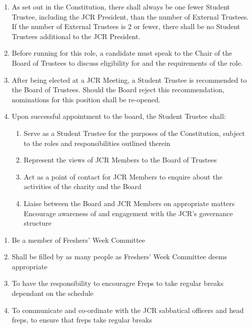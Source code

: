 \begin{enumerate}
    \item As set out in the Constitution, %
    there shall always be one fewer Student Trustee, including the JCR President, than the number of External Trustees. %
    If the number of External Trustees is 2 or fewer, there shall be no Student Trustees additional to the JCR President.
    \item Before running for this role, a candidate must speak to the Chair of the Board of Trustees to discuss eligibility for and the requirements of the role.
    \item After being elected at a JCR Meeting, a Student Trustee is recommended to the Board of Trustees. Should the Board reject this recommendation, nominations for this position shall be re-opened. 
    \item Upon successful appointment to the board, the Student Trustee shall:
    \begin{enumerate}
        \item Serve as a Student Trustee %
        for the purposes of the Constitution, subject to the roles and responsibilities outlined therein
        \item Represent the views of JCR Members to the Board of Trustees
        \item Act as a point of contact for JCR Members to enquire about the activities of the charity and the Board
        \item Liaise between the Board and JCR Members on appropriate matters
        \items Encourage awareness of and engagement with the JCR's governance structure
    \end{enumerate}
\end{enumerate}

\begin{enumerate}
    \item Be a member of Freshers’ Week Committee
    \item Shall be filled by as many people as Freshers’ Week Committee deems appropriate
    \item To have the responsibility to encouragre Freps to take regular breaks dependant on the schedule
    \item To communicate and co-ordinate with the JCR sabbatical officers and head freps, to ensure that freps take regular breaks
\end{enumerate}

